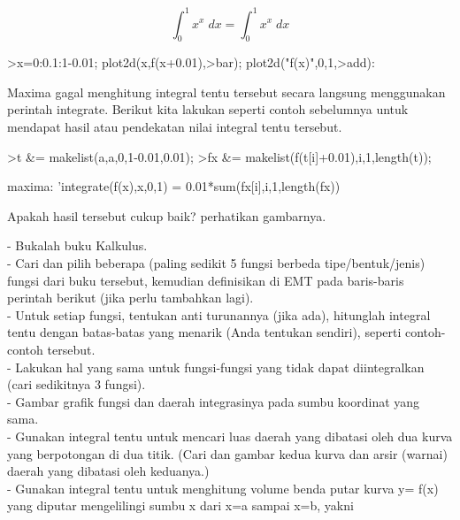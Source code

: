 \documentclass[a4paper,10pt]{article}
\begin{document}
\begin{eulernotebook}
\begin{eulercomment}
\begin{eulercomment}
\begin{euleroutput}
\end{euleroutput}
\begin{eulerformula}
\[
\int_{0}^{1}{x^{x}\;dx}=\int_{0}^{1}{x^{x}\;dx}
\]
\end{eulerformula}
\begin{eulerprompt}
>x=0:0.1:1-0.01; plot2d(x,f(x+0.01),>bar); plot2d("f(x)",0,1,>add):
\end{eulerprompt}
\begin{eulercomment}
Maxima gagal menghitung integral tentu tersebut secara langsung menggunakan perintah
integrate. Berikut kita lakukan seperti contoh sebelumnya untuk mendapat hasil atau
pendekatan nilai integral tentu tersebut.
\end{eulercomment}
\begin{eulerprompt}
>t &= makelist(a,a,0,1-0.01,0.01);
>fx &= makelist(f(t[i]+0.01),i,1,length(t));
\end{eulerprompt}
\begin{eulercomment}
maxima: 'integrate(f(x),x,0,1) = 0.01*sum(fx[i],i,1,length(fx))

Apakah hasil tersebut cukup baik? perhatikan gambarnya.
\end{eulercomment}
\begin{eulercomment}
- Bukalah buku Kalkulus.\\
- Cari dan pilih beberapa (paling sedikit 5 fungsi berbeda
tipe/bentuk/jenis) fungsi dari buku tersebut, kemudian definisikan di
EMT pada baris-baris perintah berikut (jika perlu tambahkan lagi).\\
- Untuk setiap fungsi, tentukan anti turunannya (jika ada), hitunglah
integral tentu dengan batas-batas yang menarik (Anda tentukan
sendiri), seperti contoh-contoh tersebut.\\
- Lakukan hal yang sama untuk fungsi-fungsi yang tidak dapat
diintegralkan (cari sedikitnya 3 fungsi).\\
- Gambar grafik fungsi dan daerah integrasinya pada sumbu koordinat
yang sama.\\
- Gunakan integral tentu untuk mencari luas daerah yang dibatasi oleh
dua kurva yang berpotongan di dua titik. (Cari dan gambar kedua kurva
dan arsir (warnai) daerah yang dibatasi oleh keduanya.)\\
- Gunakan integral tentu untuk menghitung volume benda putar kurva y=
f(x) yang diputar mengelilingi sumbu x dari x=a sampai x=b, yakni


\end{eulercomment}
\end{eulercomment}
\end{eulercomment}
\end{eulernotebook}
\end{document}
